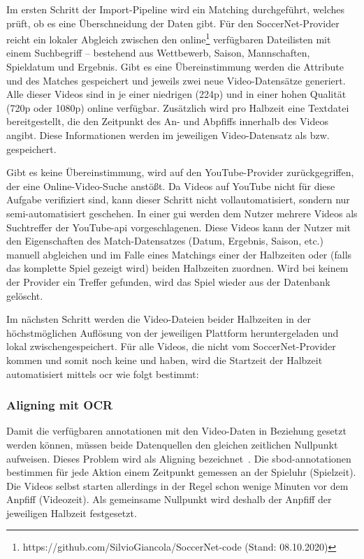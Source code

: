 Im ersten Schritt der Import-Pipeline wird ein Matching durchgeführt, welches prüft, ob es eine Überschneidung der Daten gibt.
Für den SoccerNet-Provider reicht ein lokaler Abgleich zwischen den online\footnote{https://github.com/SilvioGiancola/SoccerNet-code (Stand: 08.10.2020)} verfügbaren Dateilisten mit einem Suchbegriff -- bestehend aus Wettbewerb, Saison, Mannschaften, Spieldatum und Ergebnis.
Gibt es eine Übereinstimmung werden die Attribute  und  des Matches gespeichert und jeweils zwei neue Video-Datensätze generiert.
Alle dieser Videos sind in je einer niedrigen (224p) und in einer hohen Qualität (720p oder 1080p) online verfügbar.
Zusätzlich wird pro Halbzeit eine Textdatei bereitgestellt, die den Zeitpunkt des An- und Abpfiffs innerhalb des Videos angibt.
Diese Informationen werden im jeweiligen Video-Datensatz als  bzw.  gespeichert.

Gibt es keine Übereinstimmung, wird auf den YouTube-Provider zurückgegriffen, der eine Online-Video-Suche anstößt.
Da Videos auf YouTube nicht für diese Aufgabe verifiziert sind, kann dieser Schritt nicht vollautomatisiert, sondern nur semi-automatisiert geschehen.
In einer \gls{gui} werden dem Nutzer mehrere Videos als Suchtreffer der YouTube-\gls{api} vorgeschlagenen.
Diese Videos kann der Nutzer mit den Eigenschaften des Match-Datensatzes (Datum, Ergebnis, Saison, etc.) manuell abgleichen und im Falle eines Matchings einer der Halbzeiten oder (falls das komplette Spiel gezeigt wird) beiden Halbzeiten zuordnen.
Wird bei keinem der Provider ein Treffer gefunden, wird das Spiel wieder aus der Datenbank gelöscht.

Im nächsten Schritt werden die Video-Dateien beider Halbzeiten in der höchstmöglichen Auflösung von der jeweiligen Plattform heruntergeladen und lokal zwischengespeichert.
Für alle Videos, die nicht vom SoccerNet-Provider kommen und somit noch keine  und  haben, wird die Startzeit der Halbzeit automatisiert mittels \gls{ocr} wie folgt bestimmt:

\subsubsection{Aligning mit OCR}

Damit die verfügbaren \gls{annotationen} mit den Video-Daten in Beziehung gesetzt werden können, müssen beide Datenquellen den gleichen zeitlichen Nullpunkt aufweisen.
Dieses Problem wird als Aligning bezeichnet~\cite{Purushwalkam20}.
Die \gls{sbod}-\gls{annotationen} bestimmen für jede Aktion einem Zeitpunkt gemessen an der Spieluhr (Spielzeit).
Die Videos selbst starten allerdings in der Regel schon wenige Minuten vor dem Anpfiff (Videozeit).
Als gemeinsame Nullpunkt wird deshalb der Anpfiff der jeweiligen Halbzeit festgesetzt.


